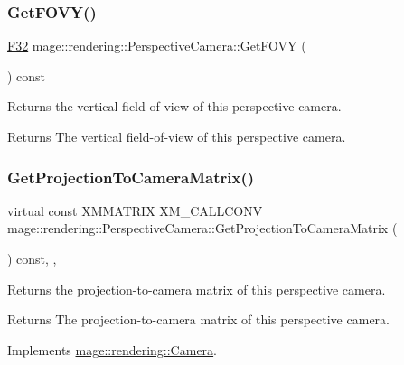 \subsubsection{\texorpdfstring{Get\+F\+O\+V\+Y()}{GetFOVY()}}
{\footnotesize\ttfamily \hyperlink{namespacemage_aa97e833b45f06d60a0a9c4fc22ae02c0}{F32} mage\+::rendering\+::\+Perspective\+Camera\+::\+Get\+F\+O\+VY (\begin{DoxyParamCaption}{ }\end{DoxyParamCaption}) const\hspace{0.3cm}{\ttfamily [noexcept]}}

Returns the vertical field-\/of-\/view of this perspective camera.

\begin{DoxyReturn}{Returns}
The vertical field-\/of-\/view of this perspective camera. 
\end{DoxyReturn}
\hypertarget{classmage_1_1rendering_1_1_perspective_camera_af049c6330ebdaa822bfd31dc88f25ac2}{}\label{classmage_1_1rendering_1_1_perspective_camera_af049c6330ebdaa822bfd31dc88f25ac2} 
\subsubsection{\texorpdfstring{Get\+Projection\+To\+Camera\+Matrix()}{GetProjectionToCameraMatrix()}}
{\footnotesize\ttfamily virtual const X\+M\+M\+A\+T\+R\+IX X\+M\+\_\+\+C\+A\+L\+L\+C\+O\+NV mage\+::rendering\+::\+Perspective\+Camera\+::\+Get\+Projection\+To\+Camera\+Matrix (\begin{DoxyParamCaption}{ }\end{DoxyParamCaption}) const\hspace{0.3cm}{\ttfamily [override]}, {\ttfamily [virtual]}, {\ttfamily [noexcept]}}

Returns the projection-\/to-\/camera matrix of this perspective camera.

\begin{DoxyReturn}{Returns}
The projection-\/to-\/camera matrix of this perspective camera. 
\end{DoxyReturn}


Implements \hyperlink{classmage_1_1rendering_1_1_camera_abb21116f8a6c7513804431d23fa4cf17}{mage\+::rendering\+::\+Camera}.

